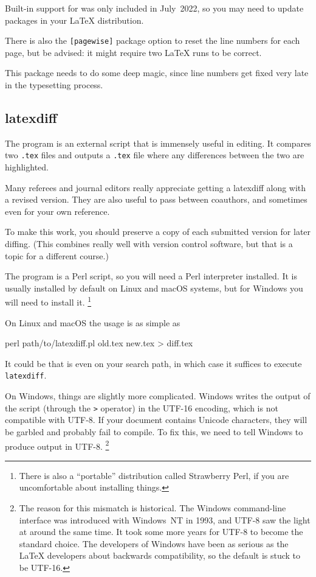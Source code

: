 \begin{gotcha}
Built-in support for 
was only included in July~2022,
so you may need to update packages in your \LaTeX{} distribution.
\end{gotcha}

There is also the \verb|[pagewise]| package option
to reset the line numbers for each page, but be advised:
it might require two \LaTeX{} runs to be correct.

\begin{technote}
This package needs to do some deep magic,
since line numbers get fixed very late in the typesetting process.
\end{technote}


%
\subsection{latexdiff}

The  program is an external script that is immensely useful in editing.
It compares two \verb|.tex| files and outputs a \verb|.tex| file
where any differences between the two are highlighted.

\begin{practices}
Many referees and journal editors really appreciate getting a latexdiff along with a revised version.
They are also useful to pass between coauthors,
and sometimes even for your own reference.

To make this work, you should preserve a copy of each submitted version for later diffing.
(This combines really well with version control software,
but that is a topic for a different course.)
\end{practices}

The  program is a Perl script,
so you will need a Perl interpreter installed.
It is usually installed by default on Linux and macOS systems,
but for Windows you will need to install it.%
\footnote{There is also a ``portable'' distribution called Strawberry Perl,
if you are uncomfortable about installing things.}

On Linux and macOS the usage is as simple as
\begin{ExampleCode}
perl path/to/latexdiff.pl old.tex new.tex > diff.tex
\end{ExampleCode}
It could be that  is even on your search path,
in which case it suffices to execute \verb|latexdiff|.

On Windows, things are slightly more complicated.
Windows writes the output of the script (through the \verb|>| operator)
in the UTF-16 encoding, which is not compatible with UTF-8.
If your document contains Unicode characters,
they will be garbled and probably fail to compile.
To fix this, we need to tell Windows to produce output in UTF-8.%
\footnote{The reason for this mismatch is historical.
The Windows command-line interface was introduced with Windows~NT in 1993,
and UTF-8 saw the light at around the same time.
It took some more years for UTF-8 to become the standard choice.
The developers of Windows have been as serious as the \LaTeX{} developers about backwards compatibility,
so the default is stuck to be UTF-16.}

